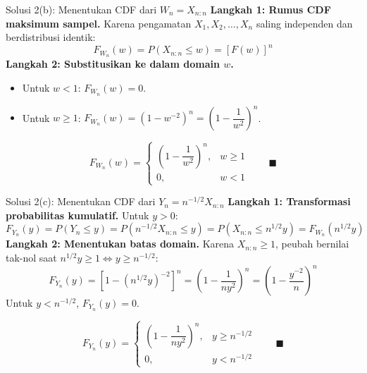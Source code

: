 \documentclass[10pt,twoside]{article}
\begin{document}
\begin{solbox}{Solusi 2(b): Menentukan CDF dari $W_n = X_{n:n}$}
\textbf{Langkah 1: Rumus CDF maksimum sampel.}
Karena pengamatan $X_1, X_2, \dots, X_n$ saling independen dan berdistribusi identik:
\[
F_{W_n}(w) = P(X_{n:n} \le w) = [F(w)]^n
\]
\textbf{Langkah 2: Substitusikan ke dalam domain $w$.}
\begin{itemize}
  \item Untuk $w < 1$: $F_{W_n}(w) = 0$.
  \item Untuk $w \ge 1$: $F_{W_n}(w) = \left(1 - w^{-2}\right)^n = \left(1 - \dfrac{1}{w^2}\right)^n$.
\end{itemize}

\[
\boxed{F_{W_n}(w) = \begin{cases} \left(1 - \dfrac{1}{w^2}\right)^n, & w \ge 1 \\ 0, & w < 1 \end{cases}} \qquad \blacksquare
\]
\end{solbox}

\begin{solbox}{Solusi 2(c): Menentukan CDF dari $Y_n = n^{-1/2} X_{n:n}$}
\textbf{Langkah 1: Transformasi probabilitas kumulatif.}
Untuk $y > 0$:
\[
F_{Y_n}(y) = P(Y_n \le y) = P\left(n^{-1/2} X_{n:n} \le y\right) = P(X_{n:n} \le n^{1/2} y) = F_{W_n}(n^{1/2} y)
\]
\textbf{Langkah 2: Menentukan batas domain.}
Karena $X_{n:n} \ge 1$, peubah bernilai tak-nol saat $n^{1/2} y \ge 1 \iff y \ge n^{-1/2}$:
\[
F_{Y_n}(y) = \left[1 - (n^{1/2} y)^{-2}\right]^n = \left(1 - \frac{1}{n y^2}\right)^n = \left(1 - \frac{y^{-2}}{n}\right)^n
\]
Untuk $y < n^{-1/2}$, $F_{Y_n}(y) = 0$.

\[
\boxed{F_{Y_n}(y) = \begin{cases} \left(1 - \dfrac{1}{n y^2}\right)^n, & y \ge n^{-1/2} \\ 0, & y < n^{-1/2} \end{cases}} \qquad \blacksquare
\]
\end{solbox}
\end{document}
